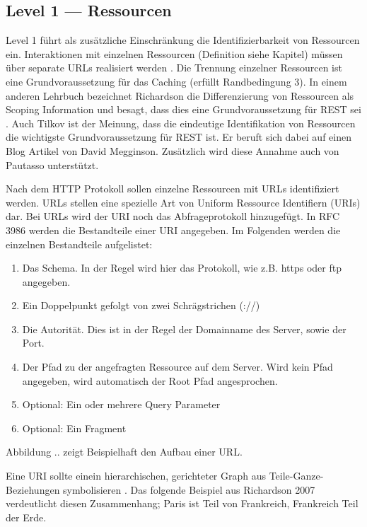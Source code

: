 \subsection{Level 1 — Ressourcen}

Level 1 führt als zusätzliche Einschränkung die Identifizierbarkeit von Ressourcen ein. Interaktionen mit einzelnen Ressourcen (Definition siehe Kapitel) müssen über separate URLs realisiert werden   . Die Trennung einzelner Ressourcen ist eine Grundvoraussetzung für das Caching (erfüllt Randbedingung 3). In einem anderen Lehrbuch bezeichnet Richardson die Differenzierung von Ressourcen als Scoping Information und besagt, dass dies eine Grundvoraussetzung für REST sei . Auch Tilkov ist der Meinung, dass die eindeutige Identifikation von Ressourcen die wichtigste Grundvoraussetzung für REST ist. Er beruft sich dabei auf einen Blog Artikel von David Megginson. Zusätzlich wird diese Annahme auch von Pautasso unterstützt.

Nach dem HTTP Protokoll sollen einzelne Ressourcen mit URLs identifiziert werden. URLs stellen eine spezielle Art von Uniform Ressource Identifiern (URIs) dar. Bei URLs wird der URI noch das Abfrageprotokoll hinzugefügt. In RFC 3986 werden die Bestandteile einer URI angegeben. Im Folgenden werden die einzelnen Bestandteile aufgelistet:

\begin{enumerate}
    \item Das Schema. In der Regel wird hier das Protokoll, wie z.B. https oder ftp angegeben.
    \item Ein Doppelpunkt gefolgt von zwei Schrägstrichen (://)
    \item Die Autorität. Dies ist in der Regel der Domainname des Server, sowie der Port.
    \item Der Pfad zu der angefragten Ressource auf dem Server. Wird kein Pfad angegeben, wird automatisch der Root Pfad angesprochen.
    \item Optional: Ein oder mehrere Query Parameter
    \item Optional: Ein Fragment
\end{enumerate}

Abbildung .. zeigt Beispielhaft den Aufbau einer URL. 

Eine URI sollte einein hierarchischen, gerichteter Graph  aus Teile-Ganze-Beziehungen symbolisieren . Das folgende Beispiel aus Richardson 2007 verdeutlicht diesen Zusammenhang; Paris ist Teil von Frankreich, Frankreich Teil der Erde.

